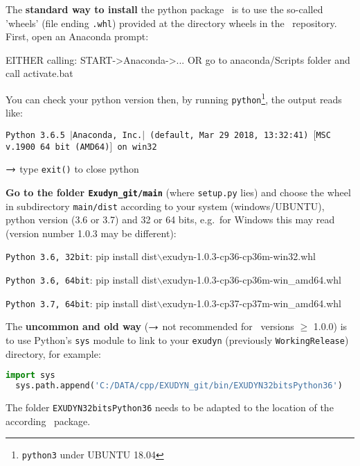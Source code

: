 The {\bf standard way to install} the python package \codeName\ is to use the so-called 'wheels' (file ending \texttt{.whl}) provided at the directory wheels in the \codeName\ repository. 
First, open an Anaconda prompt:
\bi
  \item[] EITHER calling: START->Anaconda->... OR go to anaconda/Scripts folder and call activate.bat
	\item[] You can check your python version then, by running \texttt{python}\footnote{\texttt{python3} under UBUNTU 18.04}, the output reads like:
	\bi
	  \item \texttt{Python 3.6.5 $|$Anaconda, Inc.$|$ (default, Mar 29 2018, 13:32:41) $[$MSC v.1900 64 bit (AMD64)$]$ on win32}
	\ei
	\item $\rightarrow$ type \texttt{exit()} to close python
\ei

{\bf Go to the folder \texttt{Exudyn\_git/main}} (where \texttt{setup.py} lies) and choose the wheel in subdirectory \texttt{main/dist} according to your system (windows/UBUNTU), python version (3.6 or 3.7) and 32 or 64 bits, e.g.\ for Windows this may read (version number 1.0.3 may be different):
\bi
  \item[] \texttt{Python 3.6, 32bit}: pip install dist$\backslash$exudyn-1.0.3-cp36-cp36m-win32.whl
  \item[] \texttt{Python 3.6, 64bit}: pip install dist$\backslash$exudyn-1.0.3-cp36-cp36m-win\_amd64.whl
  \item[] \texttt{Python 3.7, 64bit}: pip install dist$\backslash$exudyn-1.0.3-cp37-cp37m-win\_amd64.whl
\ei

The {\bf uncommon and old way} ($\rightarrow$ not recommended for \codeName\ versions $\ge$ 1.0.0) is to use Python's \texttt{sys} module to link to your \texttt{exudyn} (previously \texttt{WorkingRelease}) directory, for example:\vspace{6pt}\\
\pythonstyle
\begin{lstlisting}[language=Python, firstnumber=1]
  import sys
  sys.path.append('C:/DATA/cpp/EXUDYN_git/bin/EXUDYN32bitsPython36')
\end{lstlisting}
%
The folder \texttt{EXUDYN32bitsPython36} needs to be adapted to the location of the according \codeName\ package.

